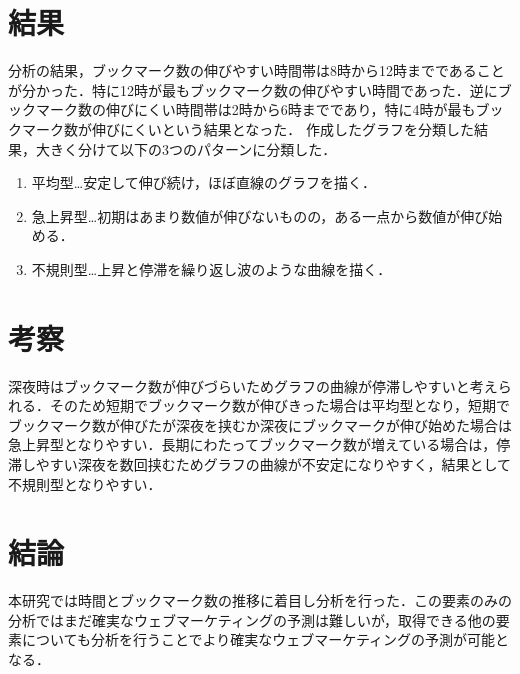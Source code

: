 \documentclass[uplatex,twocolumn,dvipdfmx]{jsarticle}
\begin{document}
\section{結果}
分析の結果，ブックマーク数の伸びやすい時間帯は8時から12時までであることが分かった．特に12時が最もブックマーク数の伸びやすい時間であった．逆にブックマーク数の伸びにくい時間帯は2時から6時までであり，特に4時が最もブックマーク数が伸びにくいという結果となった．
作成したグラフを分類した結果，大きく分けて以下の3つのパターンに分類した．
\begin{enumerate}
\item 平均型…安定して伸び続け，ほぼ直線のグラフを描く．
\item 急上昇型…初期はあまり数値が伸びないものの，ある一点から数値が伸び始める．
\item 不規則型…上昇と停滞を繰り返し波のような曲線を描く． 
\end{enumerate}


\section{考察}
深夜時はブックマーク数が伸びづらいためグラフの曲線が停滞しやすいと考えられる．そのため短期でブックマーク数が伸びきった場合は平均型となり，短期でブックマーク数が伸びたが深夜を挟むか深夜にブックマークが伸び始めた場合は急上昇型となりやすい．長期にわたってブックマーク数が増えている場合は，停滞しやすい深夜を数回挟むためグラフの曲線が不安定になりやすく，結果として不規則型となりやすい．

\section{結論}
本研究では時間とブックマーク数の推移に着目し分析を行った．この要素のみの分析ではまだ確実なウェブマーケティングの予測は難しいが，取得できる他の要素についても分析を行うことでより確実なウェブマーケティングの予測が可能となる．



\end{document}
